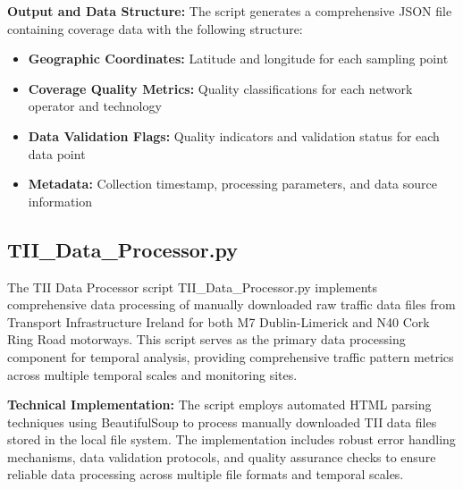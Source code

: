 \documentclass[MScCS]{uccthesis}
\begin{document}
\textbf{Output and Data Structure:}
The script generates a comprehensive JSON file containing coverage data with the following structure:

\begin{itemize}
\item \textbf{Geographic Coordinates:} Latitude and longitude for each sampling point
\item \textbf{Coverage Quality Metrics:} Quality classifications for each network operator and technology
\item \textbf{Data Validation Flags:} Quality indicators and validation status for each data point
\item \textbf{Metadata:} Collection timestamp, processing parameters, and data source information
\end{itemize}

\begin{center}
\end{center}

\subsection{TII\_Data\_Processor.py}

The TII Data Processor script {TII\_Data\_Processor.py} implements comprehensive data processing of manually downloaded raw traffic data files from Transport Infrastructure Ireland for both M7 Dublin-Limerick and N40 Cork Ring Road motorways. This script serves as the primary data processing component for temporal analysis, providing comprehensive traffic pattern metrics across multiple temporal scales and monitoring sites.

\textbf{Technical Implementation:} The script employs automated HTML parsing techniques using BeautifulSoup to process manually downloaded TII data files stored in the local file system. The implementation includes robust error handling mechanisms, data validation protocols, and quality assurance checks to ensure reliable data processing across multiple file formats and temporal scales.
\end{document}
